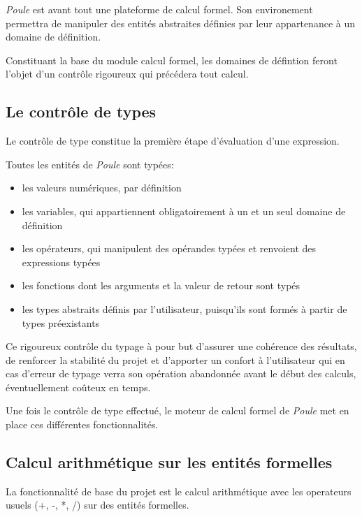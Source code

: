 \documentclass[french,12pt]{report}
\begin{document}
\emph{Poule}  est avant  tout une  plateforme de  calcul  formel.  Son
environement   permettra  de   manipuler   des  entit\'es   abstraites
d\'efinies par leur appartenance \`a un domaine de d\'efinition.


Constituant  la  base  du   module  calcul  formel,  les  domaines  de
d\'efintion feront l'objet d'un contr\^ole rigoureux qui pr\'ec\'edera
tout calcul.

\subsection{Le contr\^ole de types}

Le contr\^ole  de type constitue la  premi\`ere \'etape d'\'evaluation
d'une expression.


Toutes les entit\'es de \emph{Poule} sont typ\'ees:
\begin{itemize}
\item les valeurs num\'eriques, par d\'efinition
\item les  variables, qui appartiennent  obligatoirement \`a un  et un
  seul domaine de d\'efinition
\item  les op\'erateurs,  qui manipulent  des op\'erandes  typ\'ees et
renvoient des expressions typ\'ees
\item les  fonctions dont  les arguments et  la valeur de  retour sont
typ\'es
\item les types abstraits d\'efinis par l'utilisateur, puisqu'ils sont
form\'es \`a partir de types pr\'eexistants
\end{itemize}

Ce  rigoureux  contr\^ole  du   typage  \`a  pour  but  d'assurer  une
coh\'erence des r\'esultats, de  renforcer la stabilit\'e du projet et
d'apporter un confort \`a l'utilisateur  qui en cas d'erreur de typage
verra  son  op\'eration abandonn\'ee  avant  le  d\'ebut des  calculs,
\'eventuellement co\^uteux en temps.

Une fois le contr\^ole de  type effectu\'e, le moteur de calcul formel
de \emph{Poule} met en place ces diff\'erentes fonctionnalit\'es.

\subsection{Calcul arithm\'etique sur les entit\'es formelles}

La  fonctionnalit\'e de base  du projet  est le  calcul arithm\'etique
avec les operateurs usuels (+, -, *, /) sur des entit\'es formelles.
\end{document}

